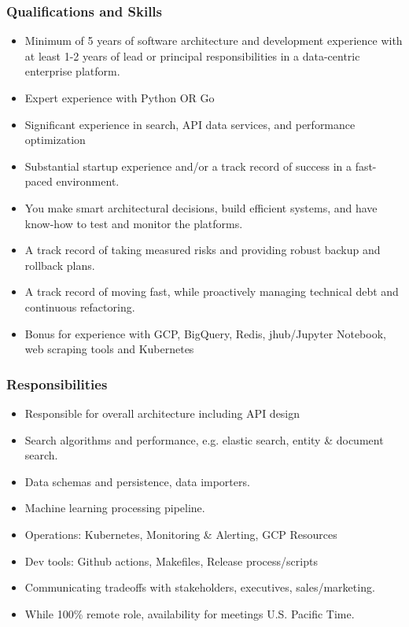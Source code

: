 \subsubsection{Qualifications and Skills} 
\begin{itemize}
    \item Minimum of 5 years of software architecture and development experience with at least 1-2 years of lead or principal responsibilities in a data-centric enterprise platform.
    \item Expert experience with Python OR Go
    \item Significant experience in search, API data services, and performance optimization
    \item Substantial startup experience and/or a track record of success in a fast-paced environment.
    \item You make smart architectural decisions, build efficient systems, and have know-how to test and monitor the platforms.
    \item A track record of taking measured risks and providing robust backup and rollback plans.
    \item A track record of moving fast, while proactively managing technical debt and continuous refactoring.
    \item Bonus for experience with GCP, BigQuery, Redis, jhub/Jupyter Notebook, web scraping tools and Kubernetes
\end{itemize}
\subsubsection{Responsibilities}
\begin{itemize}
    \item Responsible for overall architecture including API design
    \item Search algorithms and performance, e.g. elastic search, entity \& document search.
    \item Data schemas and persistence, data importers.
    \item Machine learning processing pipeline.
    \item Operations: Kubernetes, Monitoring \& Alerting, GCP Resources
    \item Dev tools: Github actions, Makefiles, Release process/scripts
    \item Communicating tradeoffs with stakeholders, executives, sales/marketing.
    \item While 100\% remote role, availability for meetings U.S. Pacific Time.
\end{itemize}

